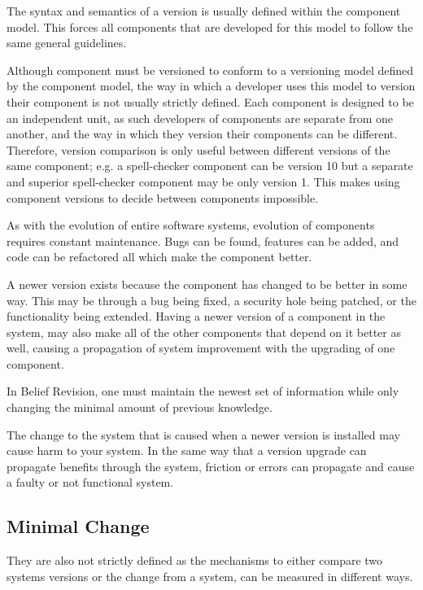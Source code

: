 The syntax and semantics of a version is usually defined within the component model.
This forces all components that are developed for this model to follow the same general guidelines.

Although component must be versioned to conform to a versioning model defined by the component model, 
the way in which a developer uses this model to version their component is not usually strictly defined.
Each component is designed to be an independent unit, as such developers of components are separate from one another,
and the way in which they version their components can be different.
Therefore, version comparison is only useful between different versions of the same component;
e.g. a spell-checker component can be version 10 but a separate and superior spell-checker component may be only version 1.
This makes using component versions to decide between components impossible.

As with the evolution of entire software systems, evolution of components requires constant maintenance.
Bugs can be found, features can be added, and code can be refactored all which make the component better.

A newer version exists because the component has changed to be better in some way.
This may be through a bug being fixed, a security hole being patched, or the functionality being extended.
Having a newer version of a component in the system, may also make all of the other components that depend on it better as well,
causing a propagation of system improvement with the upgrading of one component.

In Belief Revision, one must maintain the newest set of information while only changing the minimal amount of previous knowledge. 

The change to the system that is caused when a newer version is installed may cause harm to your system.
In the same way that a version upgrade can propagate benefits through the system, 
friction or errors can propagate and cause a faulty or not functional system.


\subsection{Minimal Change}
They are also not strictly defined as the mechanisms to either compare two systems versions or the change from a system,
can be measured in different ways.


